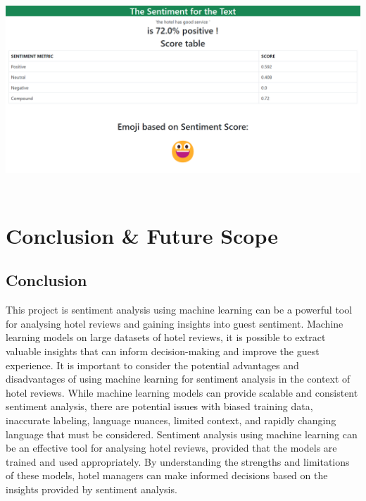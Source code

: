 \documentclass[a4paper, 12pt]{report}
\begin{document}
 \includegraphics[height=3in,width=6in]{32}\\
\chapter{Conclusion \& Future Scope}
\section{Conclusion}
This project is sentiment analysis using machine learning can be a powerful tool for analysing hotel reviews 
and gaining insights into guest sentiment. Machine learning models on large datasets of hotel reviews, it is 
possible to extract valuable insights that can inform decision-making and improve the guest experience.
It is important to consider the potential advantages and disadvantages of using machine learning for sentiment 
analysis in the context of hotel reviews. While machine learning models can provide scalable and consistent 
sentiment analysis, there are potential issues with biased training data, inaccurate labeling, language nuances, 
limited context, and rapidly changing language that must be considered. Sentiment analysis using machine 
learning can be an effective tool for analysing hotel reviews, provided that the models are trained and used 
appropriately. By understanding the strengths and limitations of these models, hotel managers can make 
informed decisions based on the insights provided by sentiment analysis.
\end{document}
